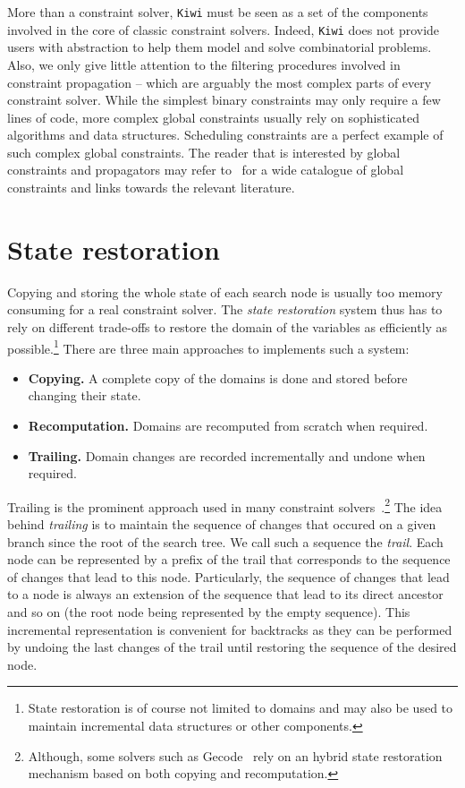 \documentclass{llncs}
\begin{document}
\noindent
More than a constraint solver, \texttt{Kiwi} must be seen as a set of the components involved in the core of classic constraint solvers. 
Indeed, \texttt{Kiwi} does not provide users with abstraction to help them model and solve combinatorial problems.
Also, we only give little attention to the filtering procedures involved in constraint propagation  -- which are arguably the most complex parts of every constraint solver.
While the simplest binary constraints may only require a few lines of code, more complex global constraints usually rely on sophisticated algorithms and data structures. 
Scheduling constraints are a perfect example of such complex global constraints. 
The reader that is interested by global constraints and propagators may refer to~\cite{beldiceanu2007global} for a wide catalogue of global constraints and links towards the relevant literature. 

\section{State restoration}

Copying and storing the whole state of each search node is usually too memory consuming for a real constraint solver. 
The \emph{state restoration} system thus has to rely on different trade-offs to restore the domain of the variables as efficiently as possible.\footnote{State restoration is of course not limited to domains and may also be used to maintain incremental data structures or other components.}
There are three main approaches to implements such a system: 
%
\begin{itemize}
  \item \textbf{Copying.} A complete copy of the domains is done and stored before changing their state.
  \item \textbf{Recomputation.} Domains are recomputed from scratch when required.
  \item \textbf{Trailing.} Domain changes are recorded incrementally and undone when required.
\end{itemize}

\noindent
Trailing is the prominent approach used in many constraint solvers~\cite{choco3,minisat,cpo,or-tools,oscar}.\footnote{Although, some solvers such as Gecode~\cite{gecode} rely on an hybrid state restoration mechanism based on both copying and recomputation.}
%
The idea behind \emph{trailing} is to maintain the sequence of changes that occured on a given branch since the root of the search tree.
We call such a sequence the \emph{trail}.
Each node can be represented by a prefix of the trail that corresponds to the sequence of changes that lead to this node. 
Particularly, the sequence of changes that lead to a node is always an extension of the sequence that lead to its direct ancestor and so on (the root node being represented by the empty sequence). 
This incremental representation is convenient for backtracks as they can be performed by undoing the last changes of the trail until restoring the sequence of the desired node.
\end{document}
